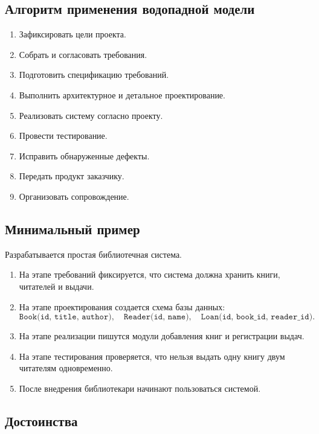 \documentclass[12pt,a4paper]{article}
\begin{document}
\subsection{Алгоритм применения водопадной модели}

\begin{enumerate}
    \item Зафиксировать цели проекта.
    \item Собрать и согласовать требования.
    \item Подготовить спецификацию требований.
    \item Выполнить архитектурное и детальное проектирование.
    \item Реализовать систему согласно проекту.
    \item Провести тестирование.
    \item Исправить обнаруженные дефекты.
    \item Передать продукт заказчику.
    \item Организовать сопровождение.
\end{enumerate}

\subsection{Минимальный пример}

Разрабатывается простая библиотечная система.

\begin{enumerate}
    \item На этапе требований фиксируется, что система должна хранить книги, читателей и выдачи.
    \item На этапе проектирования создается схема базы данных:
    \[
    \texttt{Book(id, title, author)}, \quad
    \texttt{Reader(id, name)}, \quad
    \texttt{Loan(id, book\_id, reader\_id)}.
    \]
    \item На этапе реализации пишутся модули добавления книг и регистрации выдач.
    \item На этапе тестирования проверяется, что нельзя выдать одну книгу двум читателям одновременно.
    \item После внедрения библиотекари начинают пользоваться системой.
\end{enumerate}

\subsection{Достоинства}
\end{document}
